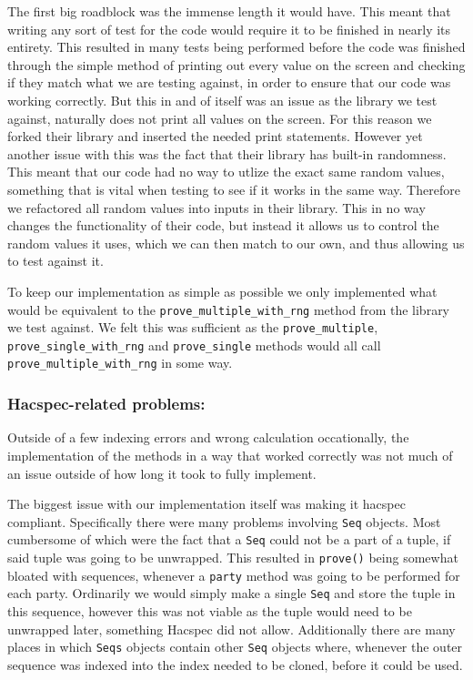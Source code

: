 \documentclass{article}
\begin{document}
The first big roadblock was the immense length it would have. This meant that writing any sort of test for the code would require it to be finished in nearly its entirety. This resulted in many tests being performed before the code was finished through the simple method of printing out every value on the screen and checking if they match what we are testing against, in order to ensure that our code was working correctly. But this in and of itself was an issue as the library we test against, naturally does not print all values on the screen. For this reason we forked their library and inserted the needed print statements. However yet another issue with this was the fact that their library has built-in randomness. This meant that our code had no way to utlize the exact same random values, something that is vital when testing to see if it works in the same way. Therefore we refactored all random values into inputs in their library. This in no way changes the functionality of their code, but instead it allows us to control the random values it uses, which we can then match to our own, and thus allowing us to test against it. 

To keep our implementation as simple as possible we only implemented what would be equivalent to the \texttt{prove\_multiple\_with\_rng} method from the library we test against. We felt this was sufficient as the \texttt{prove\_multiple}, \texttt{prove\_single\_with\_rng} and \texttt{prove\_single} methods would all call \texttt{prove\_multiple\_with\_rng} in some way.

\subsubsection{Hacspec-related problems:}

Outside of a few indexing errors and wrong calculation occationally, the implementation of the methods in a way that worked correctly was not much of an issue outside of how long it took to fully implement. 

The biggest issue with our implementation itself was making it hacspec compliant. Specifically there were many problems involving \texttt{Seq} objects. Most cumbersome of which were the fact that a \texttt{Seq} could not be a part of a tuple, if said tuple was going to be unwrapped. This resulted in \texttt{prove()} being somewhat bloated with sequences, whenever a \texttt{party} method was going to be performed for each party. Ordinarily we would simply make a single \texttt{Seq} and store the tuple in this sequence, however this was not viable as the tuple would need to be unwrapped later, something Hacspec did not allow. Additionally there are many places in which \texttt{Seqs} objects contain other \texttt{Seq} objects where, whenever the outer sequence was indexed into the index needed to be cloned, before it could be used. 
\end{document}
